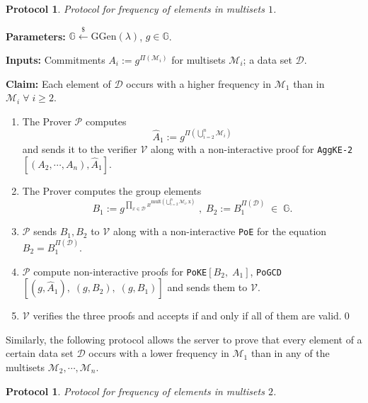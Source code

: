 \documentclass[11pt, lettersize, notitlepage, leqno, footskip=0.6cm]{article}
\newcommand{\pl}{\prod\limits}
\newcommand{\bG}{\mathbb{G}}
\newcommand{\mc}{\mathcal}
\newcommand{\mb}{\mathbb}
\newcommand{\mr}{\mathrm}
\newcommand{\lamb}{\lambda}
\newcommand{\what}{\widehat}
\newcommand{\mP}{\mc{P}}
\newcommand{\V}{\mc{V}}
\newcommand{\vs}{\vspace{-0.15cm}}
\newcommand{\noin}{\noindent}
\newtheorem{Prot}[Thm]{Protocol}
\numberwithin{equation}{section}
\begin{document}
\begin{Prot} Protocol for frequency of elements in multisets $1$.\end{Prot} \vspace{-0.3cm}

\noin \textbf{Parameters:} $\mb{G}\xleftarrow{\$} \mr{GGen}(\lamb)$,\; $g\in \mb{G}$.

\noin \textbf{Inputs:} Commitments $A_i := g^{\Pi(\mc{M}_i)}$ for multisets $\mc{M}_i$; a data set $\mc{D}$.

\noin \textbf{Claim:} Each element of $\mc{D}$ occurs with a higher frequency in $\mc{M}_1$ than in $\mc{M}_i\;\forall\;i\geq 2$.\vs

\begin{enumerate}[wide, labelwidth=!, labelindent=0pt] \vs

\item The Prover $\mP$ computes \vs $$\what{A}_1:= g^{\Pi\left(\bigcup\limits_{i=2}^n \mc{M}_i\right)} $$ and sends it to the verifier $\V$ along with a non-interactive proof for \verb|AggKE-2|$[(A_2,\cdots,A_n), \what{A}_1]$. \vs

\item The Prover computes the group elements \vs $$B_1:= g^{\pl_{x\in \mc{D}} x^{\mr{mult\left(\bigcup\limits_{i=2}^n \mc{M}_i, x\right)}}}\;,\;B_2:= B_1^{\Pi(\mc{D})} \;\in\; \bG.$$ \vspace{-0.8cm}

\item $\mP$ sends $B_1, B_2$ to $\V$ along with a non-interactive \verb|PoE| for the equation $B_2= B_1^{\Pi(\mc{D})}$. \vs

\item $\mP$ compute non-interactive proofs for \verb|PoKE|$[B_2,\;A_1]$, \verb|PoGCD|$[(g, \what{A}_1),\;(g, B_2),\;(g, B_1)]$ and sends them to $\V$.\vs

\item $\V$ verifies the three proofs and accepts if and only if all of them are valid.\qed\end{enumerate}

Similarly, the following protocol allows the server to prove that every element of a certain data set $\mc{D}$ occurs with a lower frequency in $\mc{M}_1$ than in any of the multisets $\mc{M}_2,\cdots,\mc{M}_n$.

\begin{Prot} Protocol for frequency of elements in multisets $2$.\end{Prot} \vspace{-0.3cm}
\end{document}
